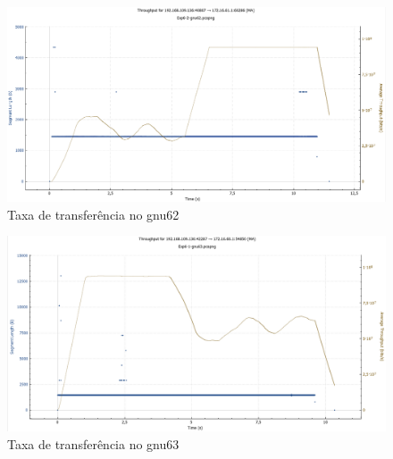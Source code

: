 \documentclass[article, a4paper, 11pt, oneside]{memoir}
\begin{document}
\begin{figure}[h]
	\centering
\includegraphics[scale=0.30]{exp6-step5-gnu62-graph.png}
\caption{Taxa de transferência no gnu62}
\end{figure}

\begin{figure}[h]
	\centering
\includegraphics[scale=0.30]{exp6-step5-gnu63-graph.png}
\caption{Taxa de transferência no gnu63}
\end{figure}

\newpage
\end{document}
